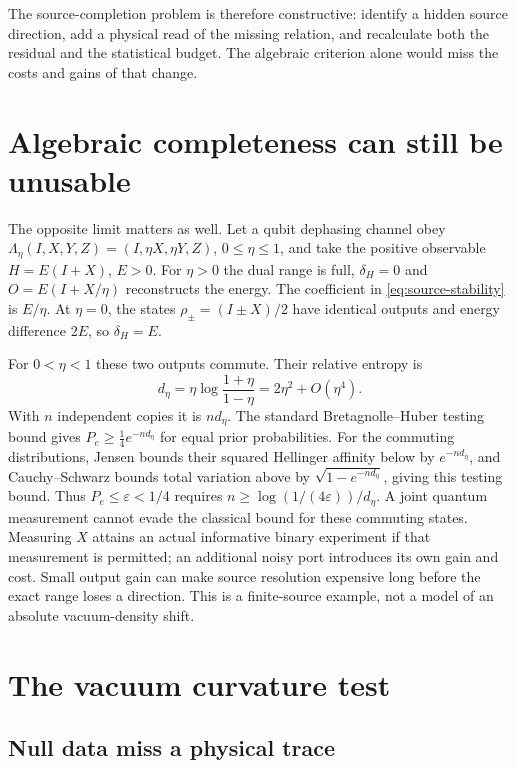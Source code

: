 \documentclass[12pt,a4paper]{article}
\theoremstyle{definition}
\begin{document}
The source-completion problem is therefore constructive: identify a
hidden source direction, add a physical read of the missing relation,
and recalculate both the residual and the statistical budget. The
algebraic criterion alone would miss the costs and gains of that change.

\section{Algebraic completeness can still be unusable}
\label{sec:conditioning}

The opposite limit matters as well. Let a qubit dephasing channel obey
$\Lambda_\eta(I,X,Y,Z)=(I,\eta X,\eta Y,Z)$, $0\leq\eta\leq1$, and
take the positive observable $H=E(I+X)$, $E>0$. For $\eta>0$ the dual
range is full, $\delta_H=0$ and $O=E(I+X/\eta)$ reconstructs the energy.
The coefficient in \eqref{eq:source-stability} is $E/\eta$.
At $\eta=0$, the states $\rho_\pm=(I\pm X)/2$ have identical outputs
and energy difference $2E$, so $\delta_H=E$.

For $0<\eta<1$ these two outputs commute. Their relative entropy is
\begin{equation}
 d_\eta=\eta\log\frac{1+\eta}{1-\eta}
        =2\eta^2+O(\eta^4).
\end{equation}
With $n$ independent copies it is $nd_\eta$. The standard
Bretagnolle--Huber testing bound \cite{BretagnolleHuber1978} gives
$P_e\geq\tfrac14e^{-nd_\eta}$ for equal prior probabilities. For the
commuting distributions, Jensen bounds their squared Hellinger affinity
below by $e^{-nd_\eta}$, and Cauchy--Schwarz bounds total variation
above by $\sqrt{1-e^{-nd_\eta}}$, giving this testing bound. Thus
$P_e\leq\varepsilon<1/4$ requires
$n\geq\log(1/(4\varepsilon))/d_\eta$. A joint quantum measurement
cannot evade the classical bound for these commuting states. Measuring
$X$ attains an actual informative binary experiment if that measurement
is permitted; an additional noisy port introduces its own gain and cost.
Small output gain can make source resolution expensive long before the
exact range loses a direction. This is a finite-source example, not a
model of an absolute vacuum-density shift.

\section{The vacuum curvature test}
\label{sec:vacuum}

\subsection{Null data miss a physical trace}
\end{document}
